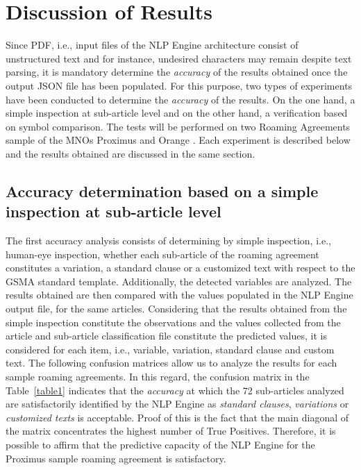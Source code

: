 \documentclass[conference]{style/IEEEtran}
\begin{document}
\section{Discussion of Results}
Since PDF, i.e., input files of the NLP Engine architecture consist of unstructured text and for instance, undesired characters may remain despite text parsing, it is mandatory determine the \textit{accuracy} of the results obtained once the output JSON file has been populated. For this purpose, two types of experiments have been conducted to determine the \textit{accuracy} of the results. On the one hand, a simple inspection at sub-article level and on the other hand, a verification based on symbol comparison. The tests will be performed on two Roaming Agreements sample of the MNOs Proximus and Orange \cite{proximus}. Each experiment is described below and the results obtained are discussed in the same section.

\subsection{Accuracy determination based on a simple inspection at sub-article level}
The first accuracy analysis consists of determining by simple inspection, i.e., human-eye inspection, whether each sub-article of the roaming agreement constitutes a variation, a standard clause or a customized text with respect to the GSMA standard template. Additionally, the detected variables are analyzed. The results obtained are then compared with the values populated in the NLP Engine output file, for the same articles. Considering that the results obtained from the simple inspection constitute the observations and the values collected from the article and sub-article classification file constitute the predicted values, it is considered for each item, i.e., variable, variation, standard clause and custom text. The following confusion matrices allow us to analyze the results for each sample roaming agreements. In this regard, the confusion matrix in the Table~\ref{table1} indicates that the \textit{accuracy} at which the 72 sub-articles analyzed are satisfactorily identified by the NLP Engine as \textit{standard clauses}, \textit{variations} or \textit{customized texts} is acceptable. Proof of this is the fact that the main diagonal of the matrix concentrates the highest number of True Positives. Therefore, it is possible to affirm that the predictive capacity of the NLP Engine for the Proximus sample roaming agreement is satisfactory. 
\end{document}
